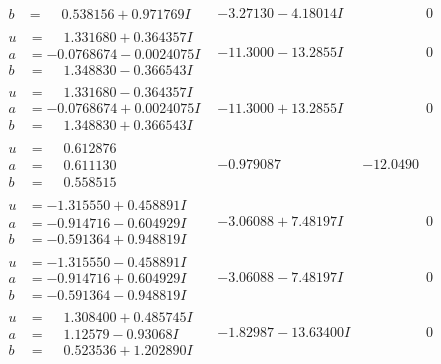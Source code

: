 \documentclass[1p]{elsarticle_modified}
\theoremstyle{definition}
\begin{document}
$$\begin{array}{c|c|c}
\begin{aligned}
b &= \phantom{-}0.538156 + 0.971769 I\end{aligned}
 & -3.27130 - 4.18014 I & \phantom{-0.000000 } 0 \\ \hline\begin{aligned}
u &= \phantom{-}1.331680 + 0.364357 I \\
a &= -0.0768674 - 0.0024075 I \\
b &= \phantom{-}1.348830 - 0.366543 I\end{aligned}
 & -11.3000 - 13.2855 I & \phantom{-0.000000 } 0 \\ \hline\begin{aligned}
u &= \phantom{-}1.331680 - 0.364357 I \\
a &= -0.0768674 + 0.0024075 I \\
b &= \phantom{-}1.348830 + 0.366543 I\end{aligned}
 & -11.3000 + 13.2855 I & \phantom{-0.000000 } 0 \\ \hline\begin{aligned}
u &= \phantom{-}0.612876\phantom{ +0.000000I} \\
a &= \phantom{-}0.611130\phantom{ +0.000000I} \\
b &= \phantom{-}0.558515\phantom{ +0.000000I}\end{aligned}
 & -0.979087\phantom{ +0.000000I} & -12.0490\phantom{ +0.000000I} \\ \hline\begin{aligned}
u &= -1.315550 + 0.458891 I \\
a &= -0.914716 - 0.604929 I \\
b &= -0.591364 + 0.948819 I\end{aligned}
 & -3.06088 + 7.48197 I & \phantom{-0.000000 } 0 \\ \hline\begin{aligned}
u &= -1.315550 - 0.458891 I \\
a &= -0.914716 + 0.604929 I \\
b &= -0.591364 - 0.948819 I\end{aligned}
 & -3.06088 - 7.48197 I & \phantom{-0.000000 } 0 \\ \hline\begin{aligned}
u &= \phantom{-}1.308400 + 0.485745 I \\
a &= \phantom{-}1.12579 - 0.93068 I \\
b &= \phantom{-}0.523536 + 1.202890 I\end{aligned}
 & -1.82987 - 13.63400 I & \phantom{-0.000000 } 0 \\ \hline\begin{aligned}

\end{aligned}
\end{array}$$
\end{document}
